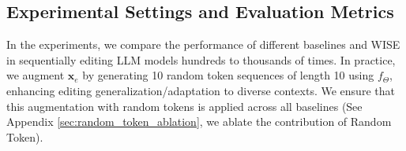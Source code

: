 \documentclass{article}
\begin{document}
\subsection{Experimental Settings and Evaluation Metrics} \label{subsec:exp_setting}
In the experiments, we compare the performance of different baselines and WISE in sequentially editing LLM models hundreds to thousands of times. In practice, we augment $\mathbf{x}_e$ by generating 10 random token sequences of length 10 using $f_{\Theta}$, enhancing editing generalization/adaptation to diverse contexts. We ensure that this augmentation with random tokens is applied across all baselines (See Appendix \ref{sec:random_token_ablation}, we ablate the contribution of Random Token).


\addtolength{\tabcolsep}{-3pt}
\begin{table}
    \vspace{-0.4cm}
    \centering
    \caption{Dataset statistics for main results.
    \textit{Locality Data} is the irrelevant data of the editing process. $T$ is the number of samples. \textit{Pre-edit} is the unedited model's performance on each dataset.}
    \vspace{-0.2cm}
    \label{tab:datasets}
    \vspace{-0.4cm}
\end{table}
\addtolength{\tabcolsep}{3pt}
\end{document}
